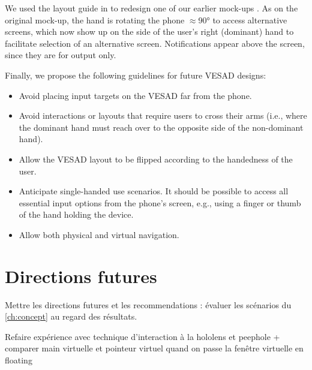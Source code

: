 We used the layout guide in  to redesign one of our earlier mock-ups . As on the original mock-up, the hand is rotating the phone $\approx$\ang{90} to access alternative screens, which now show up on the side of the user's right (dominant) hand to facilitate selection of an alternative screen. Notifications appear above the screen, since they are for output only.

Finally, we propose the following guidelines for future VESAD designs:

\begin{itemize}
  \item Avoid placing input targets on the VESAD far from the phone.
  \item Avoid interactions or layouts that require users to cross their arms (i.e., where the dominant hand must reach over to the opposite side of the non-dominant hand).
  \item Allow the VESAD layout to be flipped according to the handedness of the user.
  \item Anticipate single-handed use scenarios. It should be possible to access all essential input options from the phone's screen, e.g., using a finger or thumb of the hand holding the device.
  \item Allow both physical and virtual navigation.
\end{itemize}



\section{Directions futures}
\label{sec:future_work}

Mettre les directions futures et les recommendations : évaluer les scénarios du \autoref{ch:concept} au regard des résultats.

Refaire expérience avec technique d'interaction à la hololens et peephole + comparer main virtuelle et pointeur virtuel quand on passe la fenêtre virtuelle en floating

